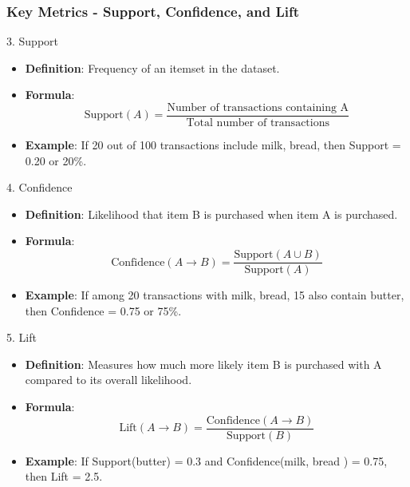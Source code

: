 \documentclass[aspectratio=169]{beamer}
\begin{document}
\begin{frame}[fragile]
    \frametitle{Key Metrics - Support, Confidence, and Lift}
    \begin{block}{3. Support}
        \begin{itemize}
            \item \textbf{Definition}: Frequency of an itemset in the dataset.
            \item \textbf{Formula}:
            \begin{equation}
                \text{Support}(A) = \frac{\text{Number of transactions containing A}}{\text{Total number of transactions}}
            \end{equation}
            \item \textbf{Example}: If 20 out of 100 transactions include {milk, bread}, then Support = 0.20 or 20\%.
        \end{itemize}
    \end{block}

    \begin{block}{4. Confidence}
        \begin{itemize}
            \item \textbf{Definition}: Likelihood that item B is purchased when item A is purchased.
            \item \textbf{Formula}:
            \begin{equation}
                \text{Confidence}(A \to B) = \frac{\text{Support}(A \cup B)}{\text{Support}(A)}
            \end{equation}
            \item \textbf{Example}: If among 20 transactions with {milk, bread}, 15 also contain {butter}, then Confidence = 0.75 or 75\%.
        \end{itemize}
    \end{block}

    \begin{block}{5. Lift}
        \begin{itemize}
            \item \textbf{Definition}: Measures how much more likely item B is purchased with A compared to its overall likelihood.
            \item \textbf{Formula}:
            \begin{equation}
                \text{Lift}(A \to B) = \frac{\text{Confidence}(A \to B)}{\text{Support}(B)}
            \end{equation}
            \item \textbf{Example}: If Support({butter}) = 0.3 and Confidence({milk, bread} ) = 0.75, then Lift = 2.5.
        \end{itemize}
    \end{block}
\end{frame}
\end{document}
